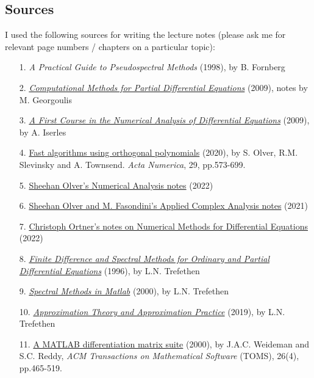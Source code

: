 \documentclass[12pt,landscape]{article}
\begin{document}
{\subsection{Sources}
I used the following sources for writing the lecture notes (please ask me for relevant page numbers / chapters on a particular topic):

\begin{itemize}
\item[1.  ] \emph{A Practical Guide to Pseudospectral Methods} (1998), by B. Fornberg


\item[2.  ] \href{http://users.math.uoc.gr/~tsogka/Courses/AEMDE-fall2015/Biblio/Georgoulis_notes_new.pdf}{\emph{Computational Methods for Partial Differential Equations}} (2009), notes by M. Georgoulis


\item[3.  ] \href{https://le.ac.uk/library}{\emph{A First Course in the Numerical Analysis of Differential Equations}} (2009), by A. Iserles 


\item[4.  ] \href{https://le.ac.uk/library}{Fast algorithms using orthogonal polynomials} (2020), by S. Olver, R.M. Slevinsky and A. Townsend. \emph{Acta Numerica}, 29, pp.573-699. 


\item[5.  ] \href{https://github.com/Imperial-MATH50003/MATH50003NumericalAnalysis2122}{Sheehan Olver's Numerical Analysis notes} (2022)


\item[6.  ] \href{https://github.com/MarcoFasondini/M3M6AppliedComplexAnalysis}{Sheehan Olver and M. Fasondini's Applied Complex Analysis notes} (2021)


\item[7.  ] \href{https://github.com/cortner/math405_2022}{Christoph Ortner's notes on Numerical Methods for Differential Equations} (2022)


\item[8.  ] \href{https://people.maths.ox.ac.uk/trefethen/pdetext.html}{\emph{Finite Difference and Spectral Methods for Ordinary and Partial Differential Equations}} (1996), by L.N. Trefethen


\item[9.  ] \href{https://people.maths.ox.ac.uk/trefethen/spectral.html}{\emph{Spectral Methods in Matlab}} (2000), by L.N. Trefethen


\item[10. ] \href{https://people.maths.ox.ac.uk/trefethen/ATAP/}{\emph{Approximation Theory and Approximation Practice}} (2019), by L.N. Trefethen


\item[11. ] \href{https://le.ac.uk/library}{A MATLAB differentiation matrix suite} (2000), by J.A.C.  Weideman and S.C. Reddy,  \emph{ACM Transactions on Mathematical Software} (TOMS), 26(4), pp.465-519.

\end{itemize}

}
\end{document}
